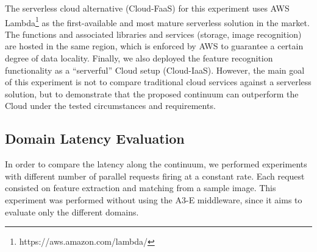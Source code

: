 


The serverless cloud alternative (Cloud-FaaS) for this experiment uses AWS Lambda\footnote{https://aws.amazon.com/lambda/} as the first-available and most mature serverless solution in the market. The functions and associated libraries and services (storage, image recognition) are hosted in the same region, which is enforced by AWS to guarantee a certain degree of data locality. Finally, we also deployed the feature recognition functionality as a ``serverful'' Cloud setup (Cloud-IaaS). However, the main goal of this experiment is not to compare traditional cloud services against a serverless solution, but to demonstrate that the proposed continuum can outperform the Cloud under the tested circumstances and requirements.


\subsection{Domain Latency Evaluation} 

In order to compare the latency along the continuum, we performed experiments with different number of parallel requests firing at a constant rate. Each request consisted on feature extraction and matching from a sample image. This experiment was performed without using the A3-E middleware, since it aims to evaluate only the different domains.

